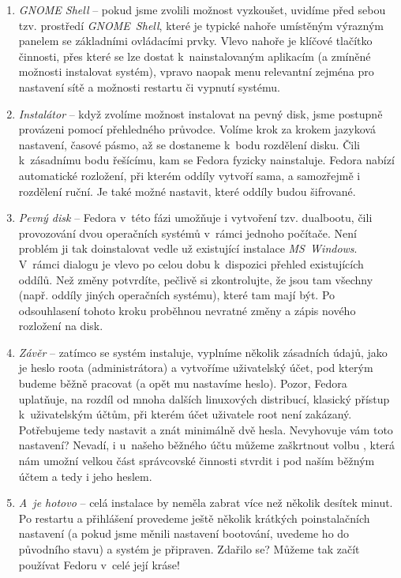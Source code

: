 \begin{enumerate}
\pagebreak

\item\emph{GNOME Shell} -- pokud jsme zvolili možnost vyzkoušet, uvidíme před sebou tzv. prostředí \emph{GNOME~Shell}, které je typické nahoře umístěným výrazným panelem se základními ovládacími prvky. Vlevo nahoře je klíčové tlačítko činnosti, přes které se lze dostat k~nainstalovaným aplikacím (a zmíněné možnosti instalovat systém), vpravo naopak menu relevantní zejména pro nastavení sítě a možnosti restartu či vypnutí systému.

\item\emph{Instalátor} -- když zvolíme možnost instalovat na pevný disk, jsme postupně provázeni pomocí přehledného průvodce. Volíme krok za krokem jazyková nastavení, časové pásmo, až se dostaneme k~bodu rozdělení disku. Čili k~zásadnímu bodu řešícímu, kam se Fedora fyzicky nainstaluje. Fedora nabízí automatické rozložení, při kterém oddíly vytvoří sama, a samozřejmě i rozdělení ruční. Je také možné nastavit, které oddíly budou šifrované.

\item\emph{Pevný disk} -- Fedora v~této fázi umožňuje i vytvoření tzv. dualbootu, čili provozování dvou operačních systémů v~rámci jednoho počítače. Není problém ji tak doinstalovat vedle už existující instalace \emph{MS~Windows}. V~rámci dialogu je vlevo po celou dobu k~dispozici přehled existujících oddílů. Než změny potvrdíte, pečlivě si zkontrolujte, že jsou tam všechny (např. oddíly jiných operačních systému), které tam mají být. Po odsouhlasení tohoto kroku proběhnou nevratné změny a zápis nového rozložení na disk.

\item\emph{Závěr} -- zatímco se systém instaluje, vyplníme několik zásadních údajů, jako je heslo roota (administrátora) a vytvoříme uživatelský účet, pod kterým budeme běžně pracovat (a opět mu nastavíme heslo). Pozor, Fedora uplatňuje, na rozdíl od mnoha dalších linuxových distribucí, klasický přístup k~uživatelským účtům, při kterém účet uživatele root není zakázaný. Potřebujeme tedy nastavit a znát minimálně dvě hesla. Nevyhovuje vám toto nastavení? Nevadí, i u~našeho běžného účtu můžeme zaškrtnout volbu , která nám umožní velkou část správcovské činnosti stvrdit i pod naším běžným účtem a tedy i jeho heslem.

\item\emph{A~je hotovo} -- celá instalace by neměla zabrat více než několik desítek minut. Po restartu a přihlášení provedeme ještě několik krátkých poinstalačních nastavení (a pokud jsme měnili nastavení bootování, uvedeme ho do původního stavu) a systém je připraven. Zdařilo se? Můžeme tak začít používat Fedoru v~celé její kráse!
\end{enumerate}
